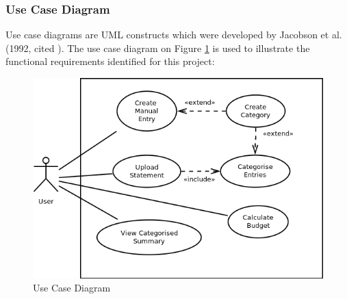 \subsubsection{Use Case Diagram} \label{sec:Requirements.FunctionalRequirements.UseCaseDiagram}
Use case diagrams are UML constructs which were developed by Jacobson et al.
(1992, cited \cite[][p.~154]{bennett2010object}). The use case diagram on
Figure \ref{fig:UseCaseDiagram} is used to illustrate the functional
requirements identified for this project:
\begin{figure}[ht!]
  \begin{center}
    \includegraphics[width=14cm]{./contents/img/Use_Case_Diagram.png}
  \end{center}
  \caption{Use Case Diagram}
  \label{fig:UseCaseDiagram}
\end{figure}
\FloatBarrier




